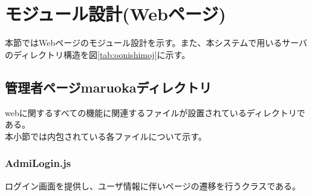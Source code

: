 \documentclass[a4j]{jarticle}
\begin{document}
\section{モジュール設計(Webページ)}

本節ではWebページのモジュール設計を示す。また、本システムで用いるサーバのディレクトリ構造を図\ref {tab:oonishimoj}に示す。%
\subsection{管理者ページmaruokaディレクトリ}
webに関するすべての機能に関連するファイルが設置されているディレクトリである。\\
本小節では内包されている各ファイルについて示す。
\subsubsection{AdmiLogin.js}
ログイン画面を提供し、ユーザ情報に伴いページの遷移を行うクラスである。
\end{document}
